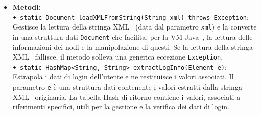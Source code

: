 {{\begin{sloppypar}
{{{\begin{itemize}
{					\texttt{+ static final String opCEx}: identificativo stringa dell'operazione di scambio dati della comunicazione nei messaggi XML\g.\\
					
					\texttt{+ static final String opIStat }: identificativo stringa dell'operazione per l'inserimento dati statistici delle comunicazioni nei messaggi XML\g.\\
					
					\texttt{+ static final String opFU}: identificativo stringa dell'operazione di ricerca utente nei messaggi XML\g.\\
					
					\texttt{+ static final String opGetStat}: identificativo stringa dell'operazione di richiesta informazioni statistici.\\
					
					\texttt{+ static final String opAnswering}: identificativo stringa dell'operazione di inserimento nuovo messaggio di segreteria.\\
					
					\texttt{+ static final String opAnsweringDelete}: identificativo stringa dell'operazione di rimozione dei  messaggi in segreteria.\\
					
					\texttt{+ static final HashMap<String, String> reference}: raccolta di riferimenti per i nodi XML\g.\\
					}
			
				\item[] \textbf{Metodi:}{\\
					\texttt{+ static Document loadXMLFromString(String xml) throws Exception};\\
					Gestisce la lettura della stringa XML\g~ (data dal parametro \texttt{xml}) e la converte in una struttura dati \texttt{Document} che facilita, per la VM Java\g~, la lettura delle informazioni dei nodi e la manipolazione di questi.
					Se la lettura della stringa XML\g~ fallisce, il metodo solleva una generica eccezione \texttt{Exception}.\\
					
					\texttt{+ static HashMap<String, String> extractLogInfo(Element e)};\\
					Estrapola i dati di login dell'utente e ne restituisce i valori associati. Il parametro \texttt{e} è una struttura dati contenente i valori estratti dalla stringa XML\g~ originaria.
					La tabella Hash di ritorno contiene i valori, associati a riferimenti specifici, utili per la gestione e la verifica dei dati di login.\\
					
}
\end{itemize}}}}
\end{sloppypar}}}
